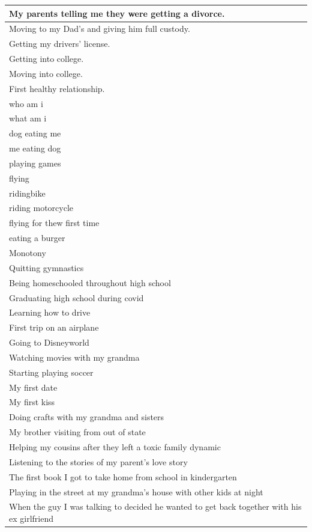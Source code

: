 \documentclass[
  .7em,
  letterpaper,
  DIV=11,
  numbers=noendperiod]{scrartcl}
\begin{document}
\begin{table}
\begin{tabular}{l}
\hline
My parents telling me they were getting a divorce.\\
\hline
Moving to my Dad's and giving him full custody.\\
\hline
Getting my drivers' license.\\
\hline
Getting into college.\\
\hline
Moving into college.\\
\hline
First healthy relationship.\\
\hline
who am i\\
\hline
what am i\\
\hline
dog eating me\\
\hline
me eating dog\\
\hline
playing games\\
\hline
flying\\
\hline
ridingbike\\
\hline
riding motorcycle\\
\hline
flying for thew first time\\
\hline
eating a burger\\
\hline
Monotony\\
\hline
Quitting gymnastics\\
\hline
Being homeschooled throughout high school\\
\hline
Graduating high school during covid\\
\hline
Learning how to drive\\
\hline
First trip on an airplane\\
\hline
Going to Disneyworld\\
\hline
Watching movies with my grandma\\
\hline
Starting playing soccer\\
\hline
My first date\\
\hline
My first kiss\\
\hline
Doing crafts with my grandma and sisters\\
\hline
My brother visiting from out of state\\
\hline
Helping my cousins after they left a toxic family dynamic\\
\hline
Listening to the stories of my parent's love story\\
\hline
The first book I got to take home from school in kindergarten\\
\hline
Playing in the street at my grandma's house with other kids at night\\
\hline
When the guy I was talking to decided he wanted to get back together with his ex girlfriend\\

\end{tabular}
\end{table}
\end{document}
